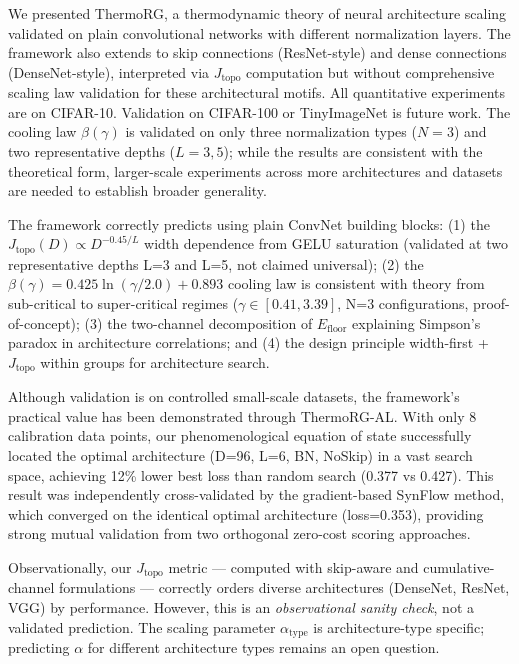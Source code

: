 \documentclass[11pt, a4paper]{article}
\theoremstyle{plain}
\begin{document}
We presented ThermoRG, a thermodynamic theory of neural architecture scaling validated on plain convolutional networks with different normalization layers. The framework also extends to skip connections (ResNet-style) and dense connections (DenseNet-style), interpreted via $J_{\mathrm{topo}}$ computation but without comprehensive scaling law validation for these architectural motifs. All quantitative experiments are on CIFAR-10. Validation on CIFAR-100 or TinyImageNet is future work. The cooling law $\beta(\gamma)$ is validated on only three normalization types ($N=3$) and two representative depths ($L=3,5$); while the results are consistent with the theoretical form, larger-scale experiments across more architectures and datasets are needed to establish broader generality.

The framework correctly predicts using plain ConvNet building blocks: (1) the $J_{\mathrm{topo}}(D) \propto D^{-0.45/L}$ width dependence from GELU saturation (validated at two representative depths L=3 and L=5, not claimed universal); (2) the $\beta(\gamma) = 0.425\ln(\gamma/2.0) + 0.893$ cooling law is consistent with theory from sub-critical to super-critical regimes ($\gamma \in [0.41, 3.39]$, N=3 configurations, proof-of-concept); (3) the two-channel decomposition of $E_{\mathrm{floor}}$ explaining Simpson's paradox in architecture correlations; and (4) the design principle width-first + $J_{\mathrm{topo}}$ within groups for architecture search.

Although validation is on controlled small-scale datasets, the framework's practical value has been demonstrated through ThermoRG-AL. With only 8 calibration data points, our phenomenological equation of state successfully located the optimal architecture (D=96, L=6, BN, NoSkip) in a vast search space, achieving 12\% lower best loss than random search (0.377 vs 0.427). This result was independently cross-validated by the gradient-based SynFlow method, which converged on the identical optimal architecture (loss=0.353), providing strong mutual validation from two orthogonal zero-cost scoring approaches.

Observationally, our $J_{\mathrm{topo}}$ metric --- computed with skip-aware and cumulative-channel formulations --- correctly orders diverse architectures (DenseNet, ResNet, VGG) by performance. However, this is an \emph{observational sanity check}, not a validated prediction. The scaling parameter $\alpha_{\mathrm{type}}$ is architecture-type specific; predicting $\alpha$ for different architecture types remains an open question.
\end{document}

